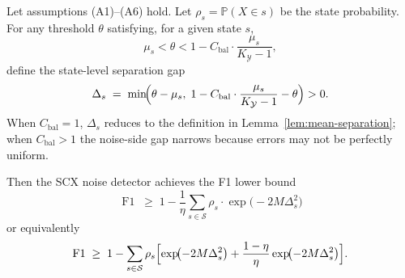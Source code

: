 \begin{theorem}
\label{thm:noise-detection}
Let assumptions (A1)--(A6) hold. Let $\rho_s = \mathbb{P}(X \in s)$ be the
state probability. For any threshold $\theta$ satisfying, for a given state $s$,
\[
\mu_s < \theta < 1 - C_{\text{bal}}\cdot\frac{\mu_s}{K_{\mathcal{Y}}-1},
\]
define the state-level separation gap
\begin{equation}
\Delta_s \;=\;
\min\!\Bigl(\theta - \mu_s,\;
  1 - C_{\text{bal}}\cdot\frac{\mu_s}{K_{\mathcal{Y}}-1} - \theta\Bigr)
> 0.
\label{eq:separation-gap-cbal}
\end{equation}
When $C_{\text{bal}} = 1$, $\Delta_s$ reduces to the definition in
Lemma~\ref{lem:mean-separation}; when $C_{\text{bal}} > 1$ the noise-side gap
narrows because errors may not be perfectly uniform.

Then the SCX noise detector achieves the F1 lower bound
\begin{equation}
\boxed{\;
\operatorname{F1} \;\geq\; 1 - \frac{1}{\eta}
\sum_{s \in \mathcal{S}} \rho_s \cdot
\exp\!\bigl(-2M\Delta_s^2\bigr)
\;}
\label{eq:f1-bound-hoeffding}
\end{equation}
or equivalently
\begin{equation}
\operatorname{F1} \;\geq\; 1 - \sum_{s \in \mathcal{S}} \rho_s \Bigl[
\exp\!\bigl(-2M\Delta_s^2\bigr)
+ \frac{1-\eta}{\eta}\exp\!\bigl(-2M\Delta_s^2\bigr)
\Bigr].
\label{eq:f1-bound-explicit}
\end{equation}
\end{theorem}

